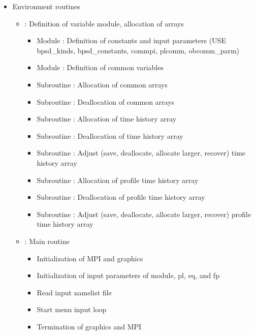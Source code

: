 \documentclass[11pt]{article}
\begin{document}
\begin{itemize}
\item
  Environment routines
  \begin{itemize}

  \item {}: Definition of variable module, allocation of
    arrays
    \begin{itemize}
    \item Module : Definition of constants and
      input parameters (USE bpsd\_kinds, bpsd\_constants, commpi,
      plcomm, obcomm\_parm)
    \item Module : Definition of common variables
    \item Subroutine : Allocation of common arrays
    \item Subroutine : Deallocation of common arrays
    \item Subroutine : Allocation of time
      history  array
    \item Subroutine : Deallocation of time
      history  array
    \item Subroutine : Adjust (save,
      deallocate, allocate larger, recover) time
      history  array
    \item Subroutine : Allocation of
      profile time history  array
    \item Subroutine : Deallocation of
      profile time history  array
    \item Subroutine : Adjust (save,
      deallocate, allocate larger, recover) profile time history
       array
    \end{itemize}

  \item {}: Main routine
    \begin{itemize}
    \item
      Initialization of MPI and graphics
    \item
      Initialization of input parameters of module, pl, eq, and fp
    \item
      Read input namelist file 
    \item
      Start menu input loop 
    \item
      Termination of graphics and MPI
    \end{itemize}


\end{itemize}
\end{itemize}
\end{document}
